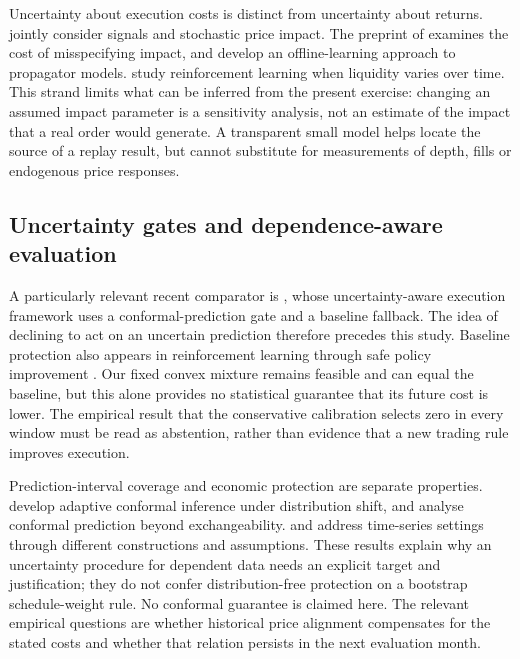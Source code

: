 Uncertainty about execution costs is distinct from uncertainty about returns. \citet{fouque2022} jointly consider signals and stochastic price impact. The preprint of \citet{hey2023} examines the cost of misspecifying impact, and \citet{neumanoffline2023} develop an offline-learning approach to propagator models. \citet{macri2024} study reinforcement learning when liquidity varies over time. This strand limits what can be inferred from the present exercise: changing an assumed impact parameter is a sensitivity analysis, not an estimate of the impact that a real order would generate. A transparent small model helps locate the source of a replay result, but cannot substitute for measurements of depth, fills or endogenous price responses.

\subsection{Uncertainty gates and dependence-aware evaluation}
A particularly relevant recent comparator is \citet{irshad2026}, whose uncertainty-aware execution framework uses a conformal-prediction gate and a baseline fallback. The idea of declining to act on an uncertain prediction therefore precedes this study. Baseline protection also appears in reinforcement learning through safe policy improvement \citep{laroche2019}. Our fixed convex mixture remains feasible and can equal the baseline, but this alone provides no statistical guarantee that its future cost is lower. The empirical result that the conservative calibration selects zero in every window must be read as abstention, rather than evidence that a new trading rule improves execution.

Prediction-interval coverage and economic protection are separate properties. \citet{gibbs2021} develop adaptive conformal inference under distribution shift, and \citet{barber2023} analyse conformal prediction beyond exchangeability. \citet{zaffran2022} and \citet{xu2021} address time-series settings through different constructions and assumptions. These results explain why an uncertainty procedure for dependent data needs an explicit target and justification; they do not confer distribution-free protection on a bootstrap schedule-weight rule. No conformal guarantee is claimed here. The relevant empirical questions are whether historical price alignment compensates for the stated costs and whether that relation persists in the next evaluation month.


